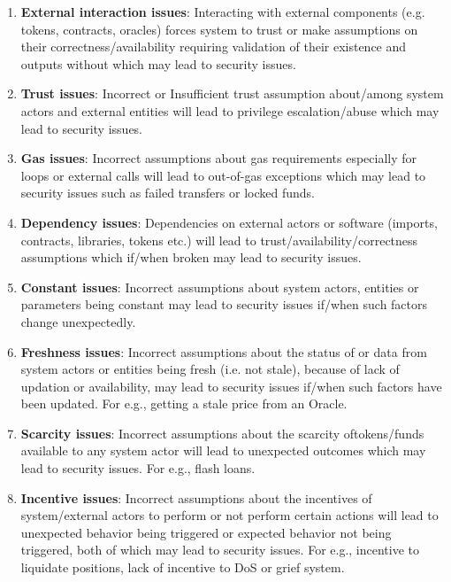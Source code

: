 \begin{enumerate}
\item\textbf{External interaction issues}: Interacting with external components (e.g. tokens, contracts, oracles) forces system to trust or make assumptions on their correctness/availability requiring validation of their existence and outputs without which may lead to security issues.

\item\textbf{Trust issues}: Incorrect or Insufficient trust assumption about/among system actors and external entities will lead to privilege escalation/abuse which may lead to security issues.

\item\textbf{Gas issues}: Incorrect assumptions about gas requirements especially for loops or external calls will lead to out-of-gas exceptions which may lead to security issues such as failed transfers or locked funds.

\item\textbf{Dependency issues}: Dependencies on external actors or software (imports, contracts, libraries, tokens etc.) will lead to trust/availability/correctness assumptions which if/when broken may lead to security issues.

\item\textbf{Constant issues}: Incorrect assumptions about system actors, entities or parameters being constant may lead to security issues if/when such factors change unexpectedly.

\item\textbf{Freshness issues}: Incorrect assumptions about the status of or data from system actors or entities being fresh (i.e. not stale), because of lack of updation or availability, may lead to security issues if/when such factors have been updated. For e.g., getting a stale price from an Oracle.

\item\textbf{Scarcity issues}: Incorrect assumptions about the scarcity of\linebreak tokens/funds available to any system actor will lead to unexpected outcomes which may lead to security issues. For e.g., flash loans.

\item\textbf{Incentive issues}: Incorrect assumptions about the incentives of system/external actors to perform or not perform certain actions will lead to unexpected behavior being triggered or expected behavior not being triggered, both of which may lead to security issues. For e.g., incentive to liquidate positions, lack of incentive to DoS or grief system.


\end{enumerate}
